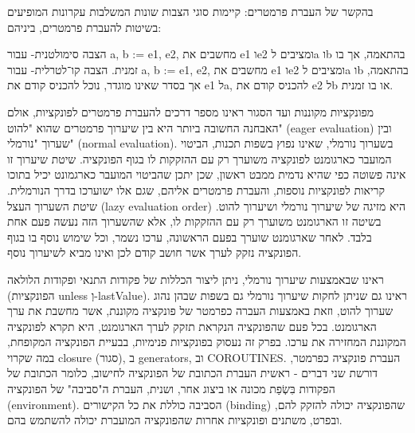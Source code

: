         בהקשר של העברת פרמטרים:
        קיימות סוגי הצבות שונות המשלבות עקרונות המופיעים בשיטות להעברת פרמטרים, ביניהם:

        הצבה סימולטנית- עבור a, b := e1, e2, מחשבים את e1 וe2 ומציבים לa וb בהתאמה, אך בו זמנית.
        הצבה קו־לטרלית- עבור a, b := e1, e2, מחשבים את e1 וe2 ומציבים לa וb בהתאמה, אך בסדר שאינו מוגדר, נוכל להכניס קודם את e1 לa, להכניס קודם את e2 לb או בו זמנית.

        מפונקציות מקוננות ועד הסגור
        ראינו מספר דרכים להעברת פרמטרים לפונקציות, אולם האבחנה החשובה ביותר היא בין
        שיערוך פרמטרים שהוא "להוט" (eager evaluation) ובין שערוך "נורמלי" (normal
        evaluation). בשערוך נורמלי, שאינו נפוץ בשפות תכנות, הביטוי המועבר כארגומנט
        לפונקציה משוערך רק עם ההזקקות לו בגוף הפונקציה. שיטת שיערוך זו אינה פשוטה כפי
        שהיא נדמית ממבט ראשון, שכן יתכן שהביטוי המועבר כארגמונט יכיל בתוכו קריאות
        לפונקציות נוספות, והעברת פרמטרים אליהם, שגם אלו ישוערכו בדרך הנורמלית. שיטת
        השערוך העצל (lazy evaluation order) היא מזיגה של שיערוך נורמלי ושיערוך להוט.
        בשיטה זו הארגומנט משוערך רק עם ההזקקות לו, אלא שהשערוך הזה נעשה פעם אחת בלבד.
        לאחר שארגומנט שוערך בפעם הראשונה, ערכו נשמר, וכל שימוש נוסף בו בגוף הפונקציה
        נזקק לערך אשר חושב קודם לכן ואינו מביא לשיערוך נוסף.

        ראינו שבאמצעות שיערוך נורמלי, ניתן ליצור הכללות של פקודות התנאי ופקודות הלולאה
        (הפונקציות unless וְ-lastValue). ראינו גם שניתן לחקות שיערוך נורמלי גם בשפות
        שבהן נהוג שערוך להוט, וזאת באמצעות העברה כפרמטר של פונקציה מקוננת, אשר מחשבת את
        ערך הארגומנט. בכל פעם שהפונקציה הנקראת תזקק לערך הארגומנט, היא תקרא לפונקציה
        המקוננת המחזירה את ערכו. בפרק זה נעסוק בפונקציות פנימיות, בבעיית הפונקציה
        המקופחת, במה שקרוי closure (סגור), ב generators, וב COROUTINES.
        העברת פונקציה כפרמטר, דורשת שני דברים - ראשית העברת הכתובת של הפונקציה לחישוב, כלומר הכתובת של הפקודות בִּשְׂפַת מכונה או ביצוג אחר, ושנית, העברת ה"סביבה" של הפונקציה (environment). הסביבה כוללת את כל הקישורים (binding) שהפונקציה יכולה להזקק להם, ובפרט, משתנים ופונקציות אחרות שהפונקציה המועברת יכולה להשתמש בהם.

